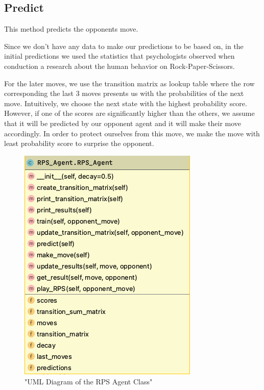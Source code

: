 \documentclass{IEEEtran}
\begin{document}
		
		
		 \label{update-matrix-code}

	\subsection{Predict}
		This method predicts the opponents move.
	
		Since we don't have any data to make our predictions to be based on, in the initial predictions we used the statistics that psychologists observed when conduction a research about the human behavior on Rock-Paper-Scissors.  
		
		For the later moves, we use the transition matrix as lookup table where the row corresponding the last 3 moves presents us with the probabilities of the next move. Intuitively, we choose the next state with the highest probability score. However, if one of the scores are significantly higher than the others, we assume that it will be predicted by our opponent agent and it will make their move accordingly. In order to protect ourselves from this move, we make the move with least probability score to surprise the opponent. 
				
		 \label{predict-code}
	
	\begin{figure}
		\centering
		\includegraphics[scale=0.5]{RPS_Agent.png}
		\caption{"UML Diagram of the RPS Agent Class"}\label{UML}
	\end{figure}
	
\end{document}
